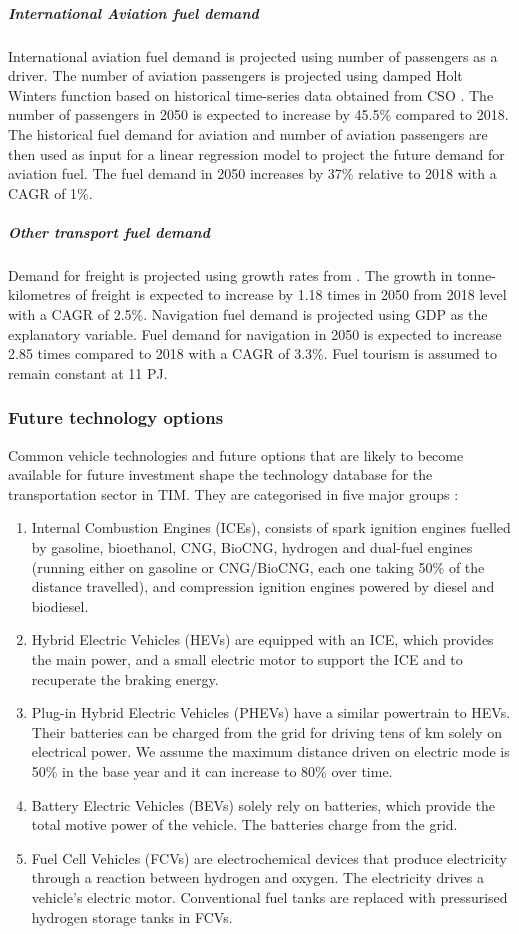 \documentclass[gmd,manuscript]{copernicus}
\begin{document}
\subparagraph{International Aviation fuel demand}
International aviation fuel demand is projected using number of passengers as a driver. The number of aviation passengers is projected using damped Holt Winters function based on historical time-series data obtained from CSO \citep{Dantas2017,Grubb2001}. The number of passengers in 2050 is expected to increase by 45.5\% compared to 2018. The historical fuel demand for aviation and number of aviation passengers are then used as input for a linear regression model to project the future demand for aviation fuel. The fuel demand in 2050 increases by 37\% relative to 2018 with a CAGR of 1\%. 

\subparagraph{Other transport fuel demand}
Demand for freight is projected using growth rates from \citet {AECOMIrelandLimited2019}. The growth in tonne-kilometres of freight is expected to increase by 1.18 times in 2050 from 2018 level with a CAGR of 2.5\%. Navigation fuel demand is projected using GDP as the explanatory variable. Fuel demand for navigation in 2050 is expected to increase 2.85 times compared to 2018 with a CAGR of 3.3\%. Fuel tourism is assumed to remain constant at 11 PJ. 

\subsubsection{Future technology options}

Common vehicle technologies and future options that are likely to become available for future investment shape the technology database for the transportation sector in TIM. They are categorised in five major groups \citep{Aryanpur2015}:

\begin{enumerate}
 \item Internal Combustion Engines (ICEs), consists of spark ignition engines fuelled by gasoline, bioethanol, CNG, BioCNG, hydrogen and dual-fuel engines (running either on gasoline or CNG/BioCNG, each one taking 50\% of the distance travelled), and compression ignition engines powered by diesel and biodiesel. 
\item Hybrid Electric Vehicles (HEVs) are equipped with an ICE, which provides the main power, and a small electric motor to support the ICE and to recuperate the braking energy. 
\item Plug-in Hybrid Electric Vehicles (PHEVs) have a similar powertrain to HEVs. Their batteries can be charged from the grid for driving tens of km solely on electrical power. We assume the maximum distance driven on electric mode is 50\% in the base year and it can increase to 80\% over time. 
\item Battery Electric Vehicles (BEVs) solely rely on batteries, which provide the total motive power of the vehicle. The batteries charge from the grid. 
\item Fuel Cell Vehicles (FCVs) are electrochemical devices that produce electricity through a reaction between hydrogen and oxygen. The electricity drives a vehicle’s electric motor. Conventional fuel tanks are replaced with pressurised hydrogen storage tanks in FCVs. 
\end{enumerate}
\end{document}
